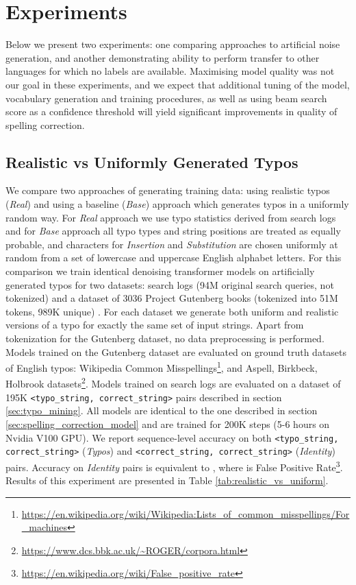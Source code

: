 \documentclass[11pt,a4paper]{article}
\begin{document}
\section{Experiments}
Below we present two experiments: one comparing approaches to artificial noise generation, and another demonstrating ability to perform transfer to other languages for which no labels are available. 
Maximising model quality was not our goal in these experiments, and we expect that additional tuning of the model, vocabulary generation and training procedures, as well as using beam search score as a confidence threshold will yield significant improvements in quality of spelling correction.
\subsection{Realistic vs Uniformly Generated Typos}
\label{sec:real_vs_uni}
We compare two approaches of generating training data: using realistic typos (\textit{Real}) and using a baseline (\textit{Base}) approach which generates typos in a uniformly random way. For \textit{Real} approach we use typo statistics derived from search logs and for \textit{Base} approach all typo types and string positions are treated as equally probable, and characters for \textit{Insertion} and \textit{Substitution} are chosen uniformly at random from a set of lowercase and uppercase English alphabet letters. For this comparison we train identical denoising transformer models on artificially generated typos for two datasets: {\fi} search logs (94M original search queries, not tokenized) and a dataset of 3036 Project Gutenberg books (tokenized into 51M tokens, 989K unique) \cite{lahiri:2014:SRW}. For each dataset we generate both uniform and realistic versions of a typo for exactly the same set of input strings. Apart from tokenization for the Gutenberg dataset, no data preprocessing is performed. Models trained on the Gutenberg dataset are evaluated on ground truth datasets of English typos: Wikipedia Common Misspellings\footnote{\url{https://en.wikipedia.org/wiki/Wikipedia:Lists_of_common_misspellings/For_machines}},  and Aspell, Birkbeck, Holbrook datasets\footnote{\url{https://www.dcs.bbk.ac.uk/~ROGER/corpora.html}}. Models trained on {\fi} search logs are evaluated on a dataset of 195K \texttt{<typo\_string, correct\_string>} pairs described in section \cref{sec:typo_mining}. All models are identical to the one described in section \cref{sec:spelling_correction_model} and are trained for 200K steps (5-6 hours on Nvidia V100 GPU). We report sequence-level accuracy on both \texttt{<typo\_string, correct\_string>} (\textit{Typos}) and \texttt{<correct\_string, correct\_string>} (\textit{Identity}) pairs. Accuracy on \textit{Identity} pairs is equivalent to , where  is False Positive Rate\footnote{\url{https://en.wikipedia.org/wiki/False_positive_rate}}. Results of this experiment are presented in Table \ref{tab:realistic_vs_uniform}.
\end{document}
